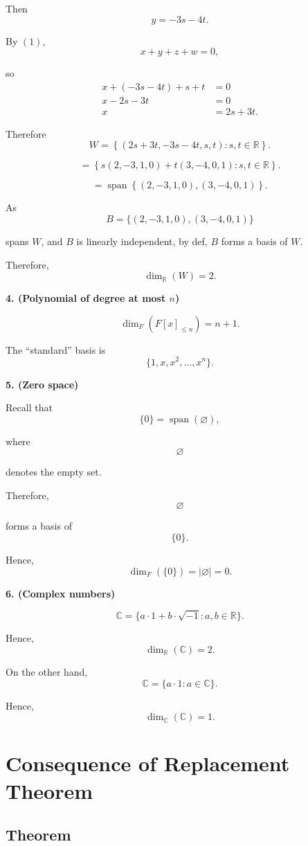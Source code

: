 \documentclass[12pt]{article}
\begin{document}
Then
\[
y=-3s-4t.
\]

By $(1)$,
\[
x+y+z+w=0,
\]

so
\begin{align*}
x+(-3s-4t)+s+t &=0\\
x-2s-3t &=0\\
x &=2s+3t.
\end{align*}

Therefore
\[
W
=
\left\{
(2s+3t,-3s-4t,s,t) : s,t\in\mathbb R
\right\}.
\]

\[
=
\left\{
s(2,-3,1,0) + t(3,-4,0,1) : s,t\in\mathbb R
\right\}.
\]

\[
=
\operatorname{span}
\left\{
(2,-3,1,0),
(3,-4,0,1)
\right\}.
\]

As
\[
B=
\{(2,-3,1,0),(3,-4,0,1)\}
\]

spans $W$, and $B$ is linearly independent, by def, $B$ forms a basis of $W$.

Therefore,
\[
\dim_{\mathbb R}(W)=2.
\]

\textbf{4. (Polynomial of degree at most $n$)}

\[
\dim_F(F[x]_{\le n})=n+1.
\]

The ``standard'' basis is
\[
\{1,x,x^2,\ldots,x^n\}.
\]

\textbf{5. (Zero space)}

Recall that
\[
\{0\}
=
\operatorname{span}(\varnothing),
\]

where
\[
\varnothing
\]

denotes the empty set.

Therefore,
\[
\varnothing
\]

forms a basis of
\[
\{0\}.
\]

Hence,
\[
\dim_F(\{0\})
=
|\varnothing|
=
0.
\]

\textbf{6. (Complex numbers)}

\[
\mathbb C
=
\{
a\cdot 1+b\cdot\sqrt{-1} : a,b\in\mathbb R\}.
\]

Hence,
\[
\dim_{\mathbb R}(\mathbb C)=2.
\]

On the other hand,
\[
\mathbb C
=
\{
a\cdot 1
:
a\in\mathbb C
\}.
\]

Hence,
\[
\dim_{\mathbb C}(\mathbb C)=1.
\]

\newpage

\section{Consequence of Replacement Theorem}

\subsection{Theorem}
\end{document}
